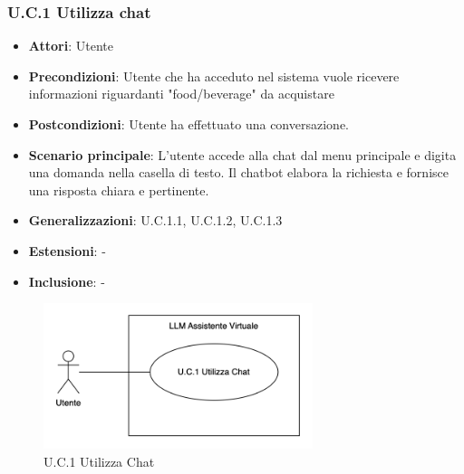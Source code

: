 \subsubsection{U.C.1 Utilizza chat} %
\begin{itemize}
    \item \textbf{Attori}: Utente
    \item \textbf{Precondizioni}: Utente che ha acceduto nel sistema vuole ricevere informazioni riguardanti "food/beverage" da acquistare
    \item \textbf{Postcondizioni}: Utente ha effettuato una conversazione.
    \item \textbf{Scenario principale}: L'utente accede alla chat dal menu principale e digita una domanda nella casella di testo. Il chatbot elabora la richiesta e fornisce una risposta chiara e pertinente.
    \item \textbf{Generalizzazioni}: U.C.1.1, U.C.1.2, U.C.1.3
    \item \textbf{Estensioni}: -
    \item \textbf{Inclusione}: -
\end{itemize}
\begin{figure}[H]
    \centering
    \includegraphics[width=0.7\textwidth]{img/UC1.png}
    \caption{U.C.1 Utilizza Chat}
\end{figure}
\newpage

